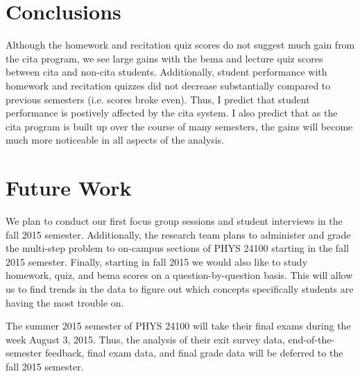 \section{Conclusions}

Although the homework and recitation quiz scores do not suggest much gain from the \gls{cita} program, we see large gains with the \gls{bema} and lecture quiz scores between \gls{cita} and non-\gls{cita} students. Additionally, student performance with homework and recitation quizzes did not decrease substantially compared to previous semesters (i.e. scores broke even). Thus, I predict that student performance is postively affected by the \gls{cita} system. I also predict that as the \gls{cita} program is built up over the course of many semesters, the gains will become much more noticeable in all aspects of the analysis.

\section{Future Work}

We plan to conduct our first focus group sessions and student interviews in the fall 2015 semester. Additionally, the research team plans to administer and grade the multi-step problem to on-campus sections of PHYS 24100 starting in the fall 2015 semester. Finally, starting in fall 2015 we would also like to study homework, quiz, and \gls{bema} scores on a question-by-question basis. This will allow us to find trends in the data to figure out which concepts specifically students are having the most trouble on.

The summer 2015 semester of PHYS 24100 will take their final exams during the week August 3, 2015. Thus, the analysis of their exit survey data, end-of-the-semester feedback, final exam data, and final grade data will be deferred to the fall 2015 semester.

\pagebreak\clearpage

